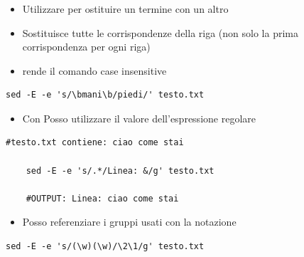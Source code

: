 \documentclass[../main.tex]{subfiles}
\begin{document}
\vspace{0.5cm}
\subsubsection{}
\begin{itemize}
    \item Utilizzare  per ostituire un termine con un altro
    \item {} Sostituisce tutte le corrispondenze della riga (non solo la prima corrispondenza per ogni riga)
    \item {} rende il comando case insensitive
\end{itemize}
\begin{lstlisting}[style=bash]
    sed -E -e 's/\bmani\b/piedi/' testo.txt
\end{lstlisting}

\vspace{0.5cm}
\begin{itemize}
    \item Con \code{\&} Posso utilizzare il valore dell'espressione regolare
\end{itemize}
\begin{lstlisting}[style=bash]
    #testo.txt contiene: ciao come stai

    sed -E -e 's/.*/Linea: &/g' testo.txt

    #OUTPUT: Linea: ciao come stai
\end{lstlisting}

\vspace{0.5cm}
\begin{itemize}
    \item Posso referenziare i gruppi usati con la notazione 
\end{itemize}
\begin{lstlisting}[style=bash]
    sed -E -e 's/(\w)(\w)/\2\1/g' testo.txt
\end{lstlisting}
\end{document}

